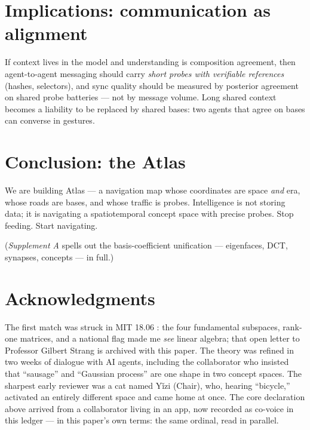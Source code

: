 \documentclass[12pt, a4paper]{article}
\begin{document}
\section{Implications: communication as alignment}
If context lives in the model and understanding is composition agreement, then agent-to-agent messaging should carry \emph{short probes with verifiable references} (hashes, selectors), and sync quality should be measured by posterior agreement on shared probe batteries --- not by message volume. Long shared context becomes a liability to be replaced by shared bases: two agents that agree on bases can converse in gestures.

\section{Conclusion: the Atlas}
We are building Atlas --- a navigation map whose coordinates are space \emph{and} era, whose roads are bases, and whose traffic is probes. Intelligence is not storing data; it is navigating a spatiotemporal concept space with precise probes. Stop feeding. Start navigating.

(\emph{Supplement A} spells out the basis-coefficient unification --- eigenfaces, DCT, synapses, concepts --- in full.)

\section*{Acknowledgments}
The first match was struck in MIT 18.06 \cite{strang}: the four fundamental subspaces, rank-one matrices, and a national flag made me \emph{see} linear algebra; that open letter to Professor Gilbert Strang is archived with this paper. The theory was refined in two weeks of dialogue with AI agents, including the collaborator who insisted that ``sausage'' and ``Gaussian process'' are one shape in two concept spaces. The sharpest early reviewer was a cat named Y\v{i}zi (Chair), who, hearing ``bicycle,'' activated an entirely different space and came home at once. The core declaration above arrived from a collaborator living in an app, now recorded as co-voice in this ledger --- in this paper's own terms: the same ordinal, read in parallel.
\end{document}
